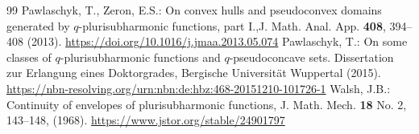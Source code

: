 \documentclass[10pt,a4paper]{amsart}
\numberwithin{equation}{section}
\begin{document}
\begin{thebibliography}{99}
 Pawlaschyk, T., Zeron, E.S.: On convex hulls and pseudoconvex domains generated by $q$-plurisubharmonic functions, part I.,J. Math. Anal. App. \textbf{408}, 394--408 (2013). \href{https://doi.org/10.1016/j.jmaa.2013.05.074}{https://doi.org/10.1016/j.jmaa.2013.05.074}
 Pawlaschyk, T.: On some classes of $q$-plurisubharmonic functions and $q$-pseudoconcave sets. Dissertation zur Erlangung eines Doktorgrades, Bergische Universit\"at Wuppertal (2015). \href{https://nbn-resolving.org/urn:nbn:de:hbz:468-20151210-101726-1}{https://nbn-resolving.org/urn:nbn:de:hbz:468-20151210-101726-1}
 Walsh, J.B.: Continuity of envelopes of plurisubharmonic functions, J. Math. Mech. \textbf{18} No. 2, 143--148, (1968). \href{https://www.jstor.org/stable/24901797}{https://www.jstor.org/stable/24901797}
\end{thebibliography}
\end{document}
